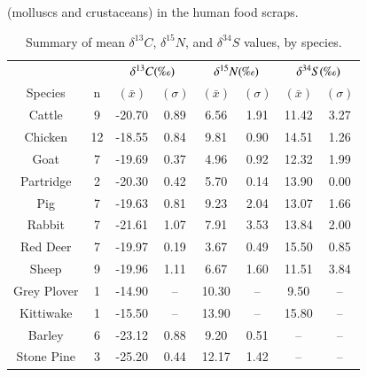 \documentclass[preprint, 3p, authoryear]{elsarticle} %
\begin{document}
(molluscs and crustaceans) in the human food scraps.






\begingroup\fontsize{7.5}{9.5}\selectfont

\begin{longtable}[t]{cccccccc}
\caption{\label{tab:table5}Summary of mean \(\delta ^{13}C\), \(\delta ^{15}N\), and \(\delta ^{34}S\) values, by species.}\\
\toprule
\multicolumn{2}{c}{ } & \multicolumn{2}{c}{\(\delta ^{13}C (\text{\textperthousand})\)} & \multicolumn{2}{c}{\(\delta ^{15}N (\text{\textperthousand})\)} & \multicolumn{2}{c}{\(\delta ^{34}S (\text{\textperthousand})\)} \\
\cmidrule(l{3pt}r{3pt}){3-4} \cmidrule(l{3pt}r{3pt}){5-6} \cmidrule(l{3pt}r{3pt}){7-8}
Species & n & $(\bar{x})$ & $(\sigma)$ & $(\bar{x})$ & $(\sigma)$ & $(\bar{x})$ & $(\sigma)$\\
\midrule
Cattle & 9 & -20.70 & 0.89 & 6.56 & 1.91 & 11.42 & 3.27\\
Chicken & 12 & -18.55 & 0.84 & 9.81 & 0.90 & 14.51 & 1.26\\
Goat & 7 & -19.69 & 0.37 & 4.96 & 0.92 & 12.32 & 1.99\\
Partridge & 2 & -20.30 & 0.42 & 5.70 & 0.14 & 13.90 & 0.00\\
Pig & 7 & -19.63 & 0.81 & 9.23 & 2.04 & 13.07 & 1.66\\
Rabbit & 7 & -21.61 & 1.07 & 7.91 & 3.53 & 13.84 & 2.00\\
Red Deer & 7 & -19.97 & 0.19 & 3.67 & 0.49 & 15.50 & 0.85\\
Sheep & 9 & -19.96 & 1.11 & 6.67 & 1.60 & 11.51 & 3.84\\
Grey Plover & 1 & -14.90 & -- & 10.30 & -- & 9.50 & --\\
Kittiwake & 1 & -15.50 & -- & 13.90 & -- & 15.80 & --\\
Barley & 6 & -23.12 & 0.88 & 9.20 & 0.51 & -- & --\\
Stone Pine & 3 & -25.20 & 0.44 & 12.17 & 1.42 & -- & --\\
\bottomrule
\end{longtable}
\endgroup{}
\end{document}
